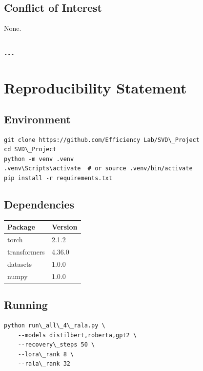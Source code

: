\subsection{Conflict of Interest}

None.
\begin{lstlisting}

---
\end{lstlisting}


\section{Reproducibility Statement}

\subsection{Environment}

\begin{lstlisting}
git clone https://github.com/Efficiency Lab/SVD\_Project
cd SVD\_Project
python -m venv .venv
.venv\Scripts\activate  # or source .venv/bin/activate
pip install -r requirements.txt
\end{lstlisting}

\subsection{Dependencies}

\begin{table}[H]
\centering
\small
\begin{tabular}{ll}
\toprule
\textbf{Package} & \textbf{Version} \\
\midrule
torch & 2.1.2 \\
transformers & 4.36.0 \\
datasets & 1.0.0 \\
numpy & 1.0.0 \\
\bottomrule
\end{tabular}
\end{table}

\subsection{Running}

\begin{lstlisting}
python run\_all\_4\_rala.py \
    --models distilbert,roberta,gpt2 \
    --recovery\_steps 50 \
    --lora\_rank 8 \
    --rala\_rank 32
\end{lstlisting}

